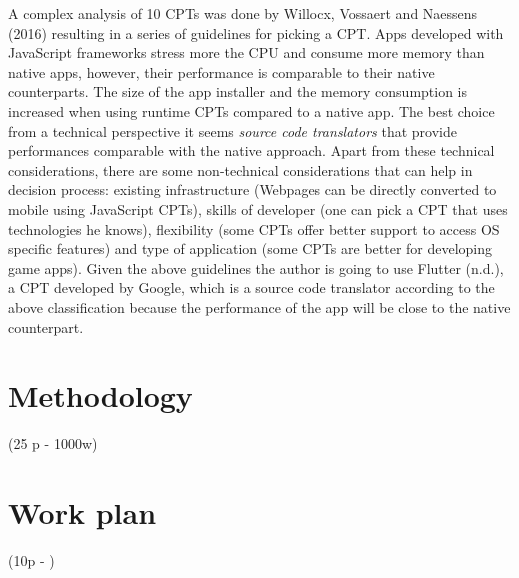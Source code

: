 \documentclass[version=last,fontsize=13pt]{scrartcl}
\begin{document}
	\indent
	A complex analysis of 10  CPTs was done by Willocx, Vossaert and Naessens (2016) resulting in a series of guidelines for picking a CPT. Apps developed with JavaScript frameworks stress more the CPU and consume more memory than native apps, however, their performance is comparable to their native counterparts. The size of the app installer and the memory consumption is increased when using runtime CPTs compared to a native app. The best choice from a technical perspective it seems \textit{source code translators} that provide performances comparable with the native approach. Apart from these technical considerations, there are some non-technical considerations that can help in decision process: existing infrastructure (Webpages can be directly converted to mobile using JavaScript CPTs), skills of developer (one can pick a CPT that uses technologies he knows), flexibility (some CPTs offer better support to access OS specific features) and type of application (some CPTs are better for developing game apps). Given the above guidelines the author is going to use Flutter (n.d.), a CPT developed by Google, which is a source code translator according to the above classification because the performance of the app will be close to the native counterpart.

\section{Methodology}(25 p - 1000w)\\


\pagebreak
\section{Work plan}(10p - )\\
\blindtext
\end{document}
